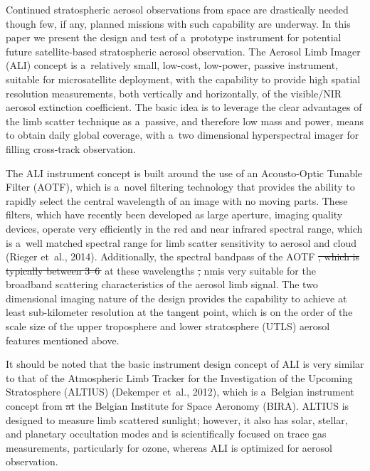 \documentclass[amtd, online, hvmath]{copernicus}
\providecommand{\DIFadd}[1]{{\protect\color{blue}\uwave{#1}}} %
\providecommand{\DIFdel}[1]{{\protect\color{red}\sout{#1}}}                      %
\providecommand{\DIFaddbegin}{} %
\providecommand{\DIFaddend}{} %
\providecommand{\DIFdelbegin}{} %
\providecommand{\DIFdelend}{} %
\begin{document}
Continued stratospheric aerosol observations from space are
drastically needed though few, if any, planned missions with such
capability are underway. In this paper we present the design and test
of a~prototype instrument for potential future satellite-based
stratospheric aerosol observation. The Aerosol Limb Imager (ALI)
concept is a~relatively small, low-cost, low-power, passive
instrument, suitable for microsatellite deployment, with the
capability to provide high spatial resolution measurements, both
vertically and horizontally, of the visible/NIR aerosol extinction
coefficient. The basic idea is to leverage the clear advantages of the
limb scatter technique as a~passive, and therefore low mass and power,
means to obtain daily global coverage, with a~two dimensional
hyperspectral imager for filling cross-track observation.

The ALI instrument concept is built around the use of an Acousto-Optic
Tunable Filter (AOTF), which is a~novel filtering technology that
provides the ability to rapidly select the central wavelength of an
image with no moving parts. These filters, which have recently been
developed as large aperture, imaging quality devices, operate very
efficiently in the red and near infrared spectral range, which is
a~well matched spectral range for limb scatter sensitivity to aerosol
and cloud (Rieger et~al., 2014).  Additionally, the spectral bandpass
of the AOTF \DIFdelbegin \DIFdel{, which is typically between 3--6\,}%
\DIFdelend \DIFaddbegin \DIFadd{has reasonable resolutions }\DIFaddend at these
wavelengths \DIFdelbegin \DIFdel{, }\DIFdelend \DIFaddbegin \DIFadd{such as 3--6\,}\unit{nm}\DIFadd{, which }\DIFaddend is very suitable for the broadband scattering
characteristics of the aerosol limb signal. The two dimensional
imaging nature of the design provides the capability to achieve at
least sub-kilometer resolution at the tangent point, which is on the
order of the scale size of the upper troposphere and lower
stratosphere (UTLS) aerosol features mentioned above.

It should be noted that the basic instrument design concept of ALI is
very similar to that of the Atmospheric Limb Tracker for the
Investigation of the Upcoming Stratosphere (ALTIUS) (Dekemper et~al.,
2012), which is a~Belgian instrument concept from \DIFdelbegin \DIFdel{at }\DIFdelend the Belgian
Institute for Space Aeronomy (BIRA).  ALTIUS is designed to measure
limb scattered sunlight; however, it also has solar, stellar, and
planetary occultation modes and is scientifically focused on trace gas
measurements, particularly for ozone, whereas ALI is optimized for
aerosol observation.
\end{document}

